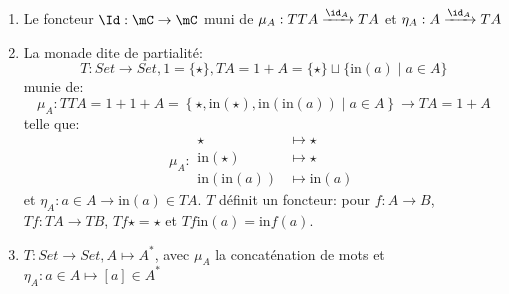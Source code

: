 \documentclass[math, info]{cours}
\begin{document}
\begin{exemple}
	\begin{enumerate}
		\item Le foncteur $\Id : \mC \to \mC$ muni de $\mu_{A} : TTA \xrightarrow{\id_{A}} TA$ et $\eta_{A}: A\xrightarrow{\id_{A}} TA$
		\item La monade dite de partialité:
			\begin{equation*}
				T: Set \to Set, 1 = \{\star\}, TA = 1 + A = \{\star\} \sqcup \{\mathrm{in}(a) \mid a \in A\}
			\end{equation*}
			munie de:
			\begin{equation*}
				\mu_{A}: TTA = 1 + 1 + A = \left\{ \star, \mathrm{in}(\star), \mathrm{in}(\mathrm{in}(a)) \mid a \in A \right\} \to TA = 1 + A
			\end{equation*}
			telle que:
			\begin{equation*}
				\mu_{A}: \begin{aligned}
						\star & \mapsto \star\\
						\mathrm{in}(\star) & \mapsto \star\\
						\mathrm{in}(\mathrm{in}(a)) &\mapsto \mathrm{in}(a)
					\end{aligned}
			\end{equation*}
			et $\eta_{A}: a\in A \to \mathrm{in}(a) \in TA$.
			$T$ définit un foncteur: pour $f: A \to B$, $Tf: TA \to TB$, $Tf \star = \star$ et $Tf \mathrm{in}(a) = \mathrm{in}f(a)$.
		\item $T: Set \to Set, A \mapsto A^{*}$, avec $\mu_{A}$ la concaténation de mots et $\eta_{A}: a\in A \mapsto [a] \in A^{*}$
	\end{enumerate}
\end{exemple}
\end{document}
